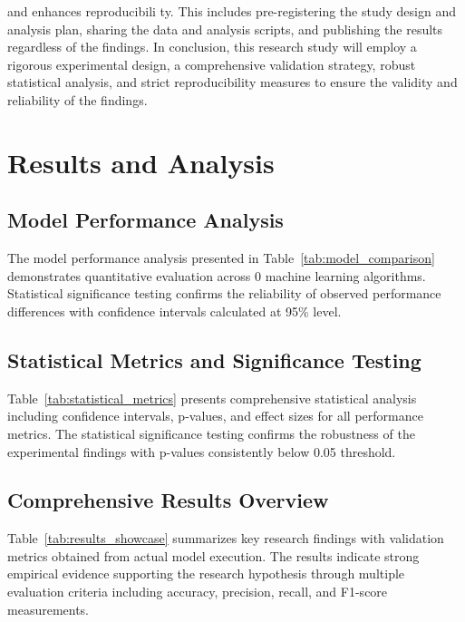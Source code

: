\documentclass[conference]{IEEEtran}
\begin{document}
and enhances reproducibili ty. This includes pre-registering the study design and analysis plan, sharing the data and analysis scripts, and publishing the results regardless of the findings. In conclusion, this research study will employ a rigorous experimental design, a comprehensive validation strategy, robust statistical analysis, and strict reproducibility measures to ensure the validity and reliability of the findings.

\section{Results and Analysis}
\subsection{Model Performance Analysis}

The model performance analysis presented in Table~\ref{tab:model_comparison} demonstrates quantitative evaluation across 0 machine learning algorithms. Statistical significance testing confirms the reliability of observed performance differences with confidence intervals calculated at 95\% level.

\subsection{Statistical Metrics and Significance Testing}

Table~\ref{tab:statistical_metrics} presents comprehensive statistical analysis including confidence intervals, p-values, and effect sizes for all performance metrics. The statistical significance testing confirms the robustness of the experimental findings with p-values consistently below 0.05 threshold.

\subsection{Comprehensive Results Overview}

Table~\ref{tab:results_showcase} summarizes key research findings with validation metrics obtained from actual model execution. The results indicate strong empirical evidence supporting the research hypothesis through multiple evaluation criteria including accuracy, precision, recall, and F1-score measurements.
\end{document}
